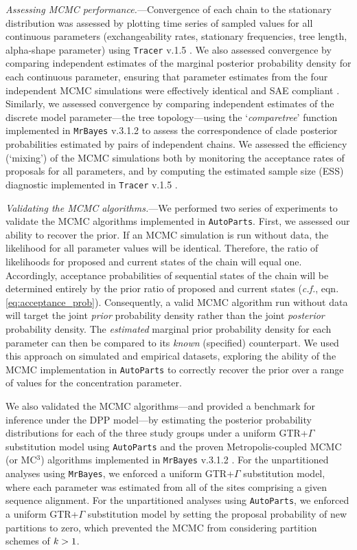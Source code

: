 \documentclass[11pt]{article}
\begin{document}
\bigskip
\noindent
{\it Assessing MCMC performance.}---Convergence of each chain to the stationary distribution was assessed by plotting time series of sampled values for all continuous parameters (exchangeability rates, stationary frequencies, tree length, alpha-shape parameter) using \verb!Tracer! v.1.5 \citep{rambaut07}.
We also assessed convergence by comparing independent estimates of the marginal posterior probability density for each continuous parameter, ensuring that parameter estimates from the four independent MCMC simulations were effectively identical and SAE compliant \citep[{\it c.f.},][]{Brooks_1997}.
Similarly, we assessed convergence by comparing independent estimates of the discrete model parameter---the tree topology---using the `{\it comparetree}' function implemented in \verb!MrBayes! v.3.1.2 \citep{ronquist03} to assess the correspondence of clade posterior probabilities estimated by pairs of independent chains. 
We assessed the efficiency (`mixing') of the MCMC simulations both by monitoring the acceptance rates of proposals for all parameters, and by computing the estimated sample size (ESS) diagnostic implemented in \verb!Tracer! v.1.5 \citep{rambaut07}.

\bigskip
\noindent
{\it Validating the MCMC algorithms.}---We performed two series of experiments to validate the MCMC algorithms implemented in \verb!AutoParts!.
First, we assessed our ability to recover the prior.
If an MCMC simulation is run without data, the likelihood for all parameter values will be identical.
Therefore, the ratio of likelihoods for proposed and current states of the chain will equal one.
Accordingly, acceptance probabilities of sequential states of the chain will be determined entirely by the prior ratio of proposed and current states (\emph{c.f.}, eqn. \ref{eq:acceptance_prob}).
Consequently, a valid MCMC algorithm run without data will target the joint \emph{prior} probability density rather than the joint \emph{posterior} probability density.
The \emph{estimated} marginal prior probability density for each parameter can then be compared to its \emph{known} (specified) counterpart.
We used this approach on simulated and empirical datasets, exploring the ability of the MCMC implementation in \verb!AutoParts! to correctly recover the prior over a range of values for the concentration parameter.  

We also validated the MCMC algorithms---and provided a benchmark for inference under the DPP model---by estimating the posterior probability distributions for each of the three study groups under a uniform GTR+$\Gamma$ substitution model using \verb!AutoParts! and the proven Metropolis-coupled MCMC (or MC$^3$) algorithms implemented in \verb!MrBayes! v.3.1.2 \citep{ronquist03}. 
For the unpartitioned analyses using \verb!MrBayes!, we enforced a uniform GTR+$\Gamma$ substitution model, where each parameter was estimated from all of the sites comprising a given sequence alignment.
For the unpartitioned analyses using \verb!AutoParts!, we enforced a uniform GTR+$\Gamma$ substitution model by setting the proposal probability of new partitions to zero, which prevented the MCMC from considering partition schemes of ${\it k} >1$.  
\end{document}
